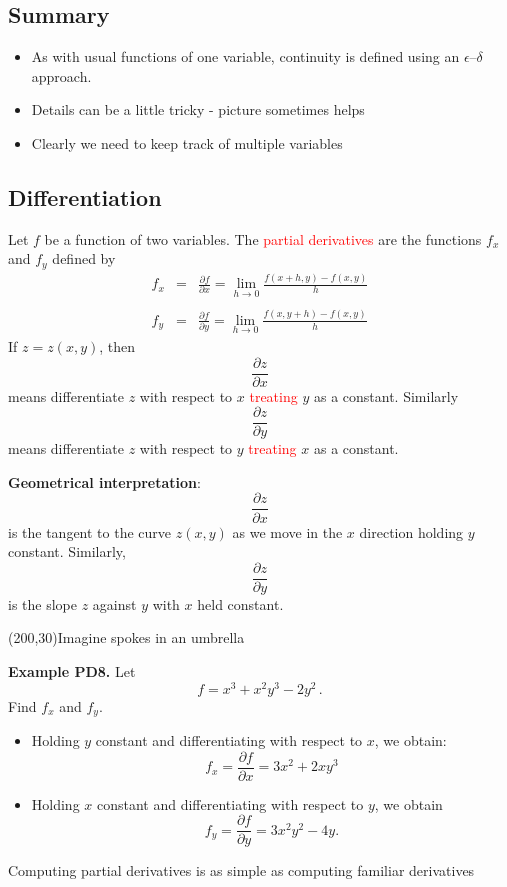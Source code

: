 \documentclass{article}
\begin{document}
\subsection{Summary}

\begin{itemize}
\item
As with usual functions of one variable, continuity is defined using an $\epsilon$--$\delta$ approach.
\item 
Details can be a little tricky - picture sometimes helps
\item
Clearly we need to keep track of multiple variables
\end{itemize}


\subsection{Differentiation}

Let $f$ be a function of two variables. The \textcolor{red}{partial derivatives} are the functions $f_x$ and
$f_y$ defined by
$$
\begin{array}{lll}
f_x & = & \frac{\partial f}{\partial x} =\lim_{h\to 0}  \frac{ f(x+h, y)-f(x,y)}{h}\\
\\
f_y & = & \frac{\partial f}{\partial y} =\lim_{h\to 0}  \frac{ f(x,y+h)-f(x,y)}{h}
\end{array}
$$
If $z=z(x,y)$, then 
$$
\frac{\partial z}{\partial x}
$$
means differentiate $z$ with respect to $x$ \textcolor{red}{treating} $y$ as a constant. Similarly
$$
\frac{\partial z}{\partial y}
$$
means differentiate $z$ with respect to $y$ \textcolor{red}{treating} $x$ as a constant.


\textbf{Geometrical interpretation}: 
$$
\frac{\partial z}{\partial x}
$$ 
is the tangent to the curve $z(x,y)$ as we move in the $x$ direction holding $y$ constant.
Similarly, 
$$
\frac{\partial z}{\partial y}
$$
is the slope $z$ against $y$ with $x$ held constant.
\vspace{3mm}
\begin{center}
\framebox(200,30){Imagine spokes in an umbrella}
\end{center}



\textbf{Example PD8.} Let
$$
f=x^3+x^2y^3 -2 y^2\,.
$$
Find $f_x$ and $f_y$.

\begin{itemize}
\item
Holding $y$ constant and differentiating with respect to $x$, we
obtain:
$$
f_x= \frac{\partial f}{\partial x} = 3x^2 +2x y^3
$$
\item
Holding $x$ constant and differentiating with respect to $y$, we
obtain
$$
f_y= \frac{\partial f}{\partial y} = 3 x^2 y^2- 4y.
$$
\end{itemize}
Computing partial derivatives is as simple as computing familiar derivatives
\end{document}
